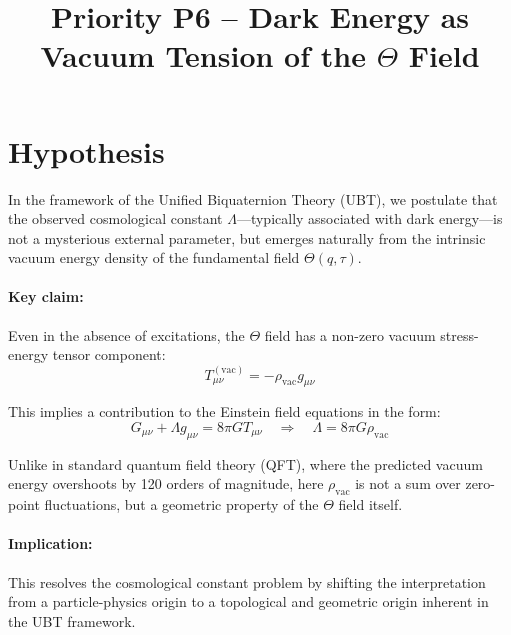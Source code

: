 \documentclass[12pt]{article}
\title{Priority P6 – Dark Energy as Vacuum Tension of the $\Theta$ Field}
\author{}
\date{}
\begin{document}
\maketitle

\section*{Hypothesis}

In the framework of the Unified Biquaternion Theory (UBT), we postulate that the observed cosmological constant $\Lambda$---typically associated with dark energy---is not a mysterious external parameter, but emerges naturally from the intrinsic vacuum energy density of the fundamental field $\Theta(q, \tau)$.

\paragraph{Key claim:} Even in the absence of excitations, the $\Theta$ field has a non-zero vacuum stress-energy tensor component:
\[
T_{\mu\nu}^{(\text{vac})} = -\rho_{\text{vac}} g_{\mu\nu}
\]

This implies a contribution to the Einstein field equations in the form:
\[
G_{\mu\nu} + \Lambda g_{\mu\nu} = 8\pi G T_{\mu\nu} \quad \Rightarrow \quad \Lambda = 8\pi G \rho_{\text{vac}}
\]

Unlike in standard quantum field theory (QFT), where the predicted vacuum energy overshoots by 120 orders of magnitude, here $\rho_{\text{vac}}$ is not a sum over zero-point fluctuations, but a geometric property of the $\Theta$ field itself.

\paragraph{Implication:} This resolves the cosmological constant problem by shifting the interpretation from a particle-physics origin to a topological and geometric origin inherent in the UBT framework.
\end{document}
